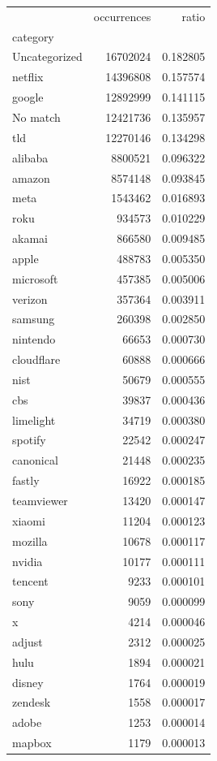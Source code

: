 \begin{tabular}{lrr}
\toprule
 & occurrences & ratio \\
category &  &  \\
\midrule
Uncategorized & 16702024 & 0.182805 \\
netflix & 14396808 & 0.157574 \\
google & 12892999 & 0.141115 \\
No match & 12421736 & 0.135957 \\
tld & 12270146 & 0.134298 \\
alibaba & 8800521 & 0.096322 \\
amazon & 8574148 & 0.093845 \\
meta & 1543462 & 0.016893 \\
roku & 934573 & 0.010229 \\
akamai & 866580 & 0.009485 \\
apple & 488783 & 0.005350 \\
microsoft & 457385 & 0.005006 \\
verizon & 357364 & 0.003911 \\
samsung & 260398 & 0.002850 \\
nintendo & 66653 & 0.000730 \\
cloudflare & 60888 & 0.000666 \\
nist & 50679 & 0.000555 \\
cbs & 39837 & 0.000436 \\
limelight & 34719 & 0.000380 \\
spotify & 22542 & 0.000247 \\
canonical & 21448 & 0.000235 \\
fastly & 16922 & 0.000185 \\
teamviewer & 13420 & 0.000147 \\
xiaomi & 11204 & 0.000123 \\
mozilla & 10678 & 0.000117 \\
nvidia & 10177 & 0.000111 \\
tencent & 9233 & 0.000101 \\
sony & 9059 & 0.000099 \\
x & 4214 & 0.000046 \\
adjust & 2312 & 0.000025 \\
hulu & 1894 & 0.000021 \\
disney & 1764 & 0.000019 \\
zendesk & 1558 & 0.000017 \\
adobe & 1253 & 0.000014 \\
mapbox & 1179 & 0.000013 \\

\end{tabular}
